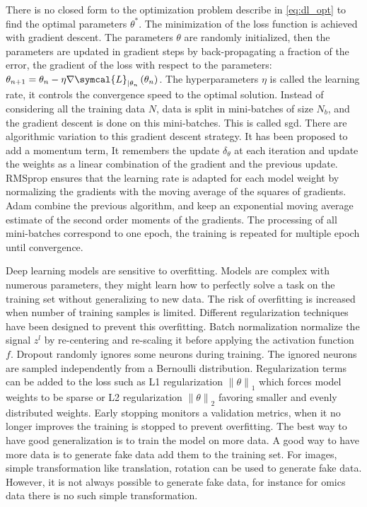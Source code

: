 \documentclass[../main.tex]{subfiles}
\begin{document}
     There is no closed form to the optimization problem describe in \cref{eq:dl_opt} to find the optimal parameters \(\theta^{*}\).
     The minimization of the loss function is achieved with gradient descent.
     The parameters \(\theta\) are randomly initialized, then the parameters are updated in gradient steps by back-propagating a fraction of the error, \ie the gradient of the loss with respect to the parameters: \(\theta_{n+1} = \theta_{n} - \eta \nabla \symcal{L}_{|\theta_n}\left(\theta_{n}\right)\).
     The hyperparameters \(\eta\) is called the learning rate, it controls the convergence speed to the optimal solution.
     Instead of considering all the training data \(N\), data is split in mini-batches of size \(N_b\), and the gradient descent is done on this mini-batches.
     This is called \gls{sgd}.
     There are algorithmic variation to this gradient descent strategy.
     It has been proposed to add a momentum term, It remembers the update \(\delta_{\theta}\) at each iteration and update the weights as a linear combination of the gradient and the previous update.
     RMSprop ensures that the learning rate is adapted for each model weight by normalizing the gradients with the moving average of the squares of gradients.
     Adam combine the previous algorithm, and keep an exponential moving average estimate of the second order moments of the gradients.
     The processing of all mini-batches correspond to one epoch, the training is repeated for multiple epoch until convergence.


     Deep learning models are sensitive to overfitting.
     Models are complex with numerous parameters, they might learn how to perfectly solve a task on the training set without generalizing to new data.
     The risk of overfitting is increased when number of training samples is limited.
     Different regularization techniques have been designed to prevent this overfitting.
     Batch normalization normalize the signal \(z^{l}\) by re-centering and re-scaling it before applying the activation function \(f\).
     Dropout randomly ignores some neurons during training.
     The ignored neurons are sampled independently from a Bernoulli distribution.
     Regularization terms can be added to the loss such as L1 regularization \({\|\theta\|}_{1}\) which forces model weights to be sparse or L2 regularization \({\|\theta\|}_{2}\) favoring smaller and evenly distributed weights.
     Early stopping monitors a validation metrics, when it no longer improves the training is stopped to prevent overfitting.
     The best way to have good generalization is to train the model on more data.
     A good way to have more data is to generate fake data add them to the training set.
     For images, simple transformation like translation, rotation can be used to generate fake data.
     However, it is not always possible to generate fake data, for instance for omics data there is no such simple transformation.
\end{document}
